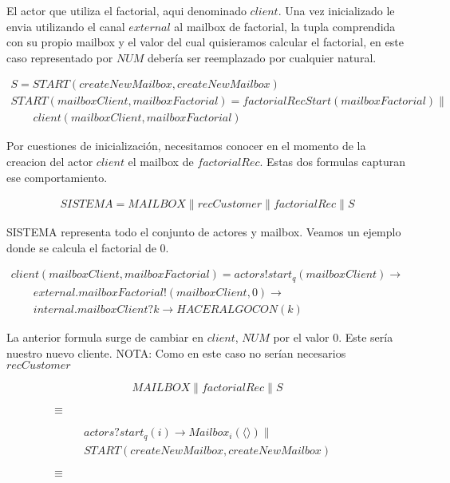 \documentclass[fleqn]{article}
\newcommand{\myList}[1]{\langle #1 \rangle}
\begin{document}
El actor que utiliza el factorial, aqui denominado $client$. Una vez inicializado le envia utilizando el canal $external$ al mailbox de factorial, la tupla comprendida con su propio mailbox y el valor del cual quisieramos calcular el factorial, en este caso representado por $NUM$ debería ser reemplazado por cualquier natural. 

\begin{gather*}
S = START(createNewMailbox, createNewMailbox) \\
START(mailboxClient, mailboxFactorial) = factorialRecStart(mailboxFactorial) \parallel \\
\qquad client(mailboxClient, mailboxFactorial) 
\end{gather*}

Por cuestiones de inicialización, necesitamos conocer en el momento de la creacion del actor $client$ el mailbox de $factorialRec$. Estas dos formulas capturan ese comportamiento.

\begin{gather*}
SISTEMA = MAILBOX \parallel recCustomer \parallel factorialRec \parallel S
\end{gather*}

SISTEMA representa todo el conjunto de actores y mailbox. Veamos un ejemplo donde se calcula el factorial de 0.

\begin{gather*}
client(mailboxClient, mailboxFactorial) =  actors!start_q(mailboxClient) \rightarrow  \\
\qquad external.mailboxFactorial!(mailboxClient,0) \rightarrow \\
\qquad internal.mailboxClient?k \rightarrow HACERALGOCON(k) 
\end{gather*}

La anterior formula surge de cambiar en $client$, $NUM$ por el valor 0. Este sería nuestro nuevo cliente. NOTA: Como en este caso no serían necesarios $recCustomer$ 

\begin{gather*}
MAILBOX \parallel factorialRec \parallel S
\end{gather*}

$\qquad \qquad \equiv$

\begin{gather*}
actors?start_q(i) \rightarrow Mailbox_i(\myList{})  \parallel \\
START(createNewMailbox, createNewMailbox) 
\end{gather*}

$\qquad \qquad \equiv$
\end{document}
